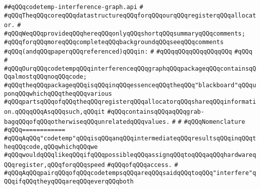 \label{src/lib/compiler/back/low/regor/codetemp-interference-graph.api}
\verb|##qQQqcodetemp-interference-graph.api|\newline
\verb|#|\newline
\verb|#qQQqTheqQQqcoreqQQqdatastructureqQQqforqQQqourqQQqregisterqQQqallocator.|\newline
\verb|#|\newline
\verb|#qQQqWeqQQqprovideqQQqhereqQQqonlyqQQqshortqQQqsummaryqQQqcomments;|\newline
\verb|#qQQqforqQQqmoreqQQqcompleteqQQqbackgroundqQQqseeqQQqcomments|\newline
\verb|#qQQq(andqQQqpaperqQQqreferenced)qQQqin:|\newline
\verb|#|\newline
\verb|#qQQqqQQqqQQqqQQqqQQq|\newline
\verb|#qQQq|\newline
\verb|#|\newline
\verb|#qQQqOurqQQqcodetempqQQqinterferenceqQQqgraphqQQqpackageqQQqcontainsqQQqalmostqQQqnoqQQqcode;|\newline
\verb|#qQQqtheqQQqpackageqQQqisqQQqinqQQqessenceqQQqtheqQQq"blackboard"qQQquponqQQqwhichqQQqtheqQQqvarious|\newline
\verb|#qQQqpartsqQQqofqQQqtheqQQqregisterqQQqallocatorqQQqshareqQQqinformation.qQQqqQQqAsqQQqsuch,qQQqit|\newline
\verb|#qQQqcontainsqQQqaqQQqgrab-bagqQQqofqQQqotherwiseqQQqunrelatedqQQqvalues.|\newline
\verb|#|\newline
\verb|#|\newline
\verb|#qQQqNomenclature|\newline
\verb|#qQQq============|\newline
\verb|#qQQqAqQQq"codetemp"qQQqisqQQqanqQQqintermediateqQQqresultsqQQqinqQQqtheqQQqcode,qQQqwhichqQQqwe|\newline
\verb|#qQQqwouldqQQqlikeqQQqifqQQqpossibleqQQqassignqQQqtoqQQqaqQQqhardwareqQQqregister,qQQqforqQQqspeed|\newline
\verb|#qQQqofqQQqaccess.|\newline
\verb|#|\newline
\verb|#qQQqAqQQqpairqQQqofqQQqcodetempsqQQqareqQQqsaidqQQqtoqQQq"interfere"qQQqifqQQqtheyqQQqareqQQqeverqQQqboth|\newline

